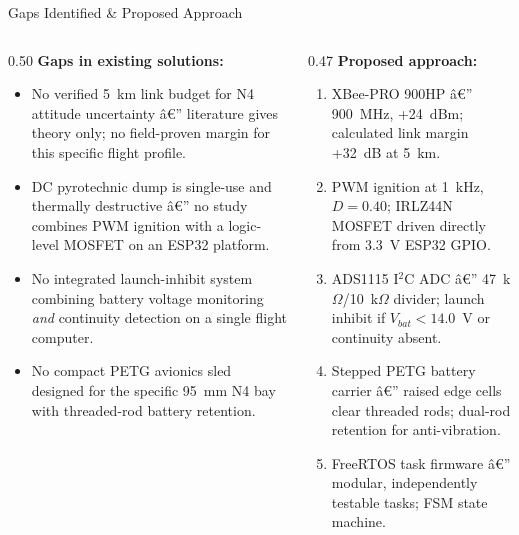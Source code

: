 \documentclass[aspectratio=169, 11pt]{beamer}
\begin{document}
\begin{frame}{Gaps Identified \& Proposed Approach}
\begin{columns}[T]
  \begin{column}{0.50\textwidth}
    \textbf{Gaps in existing solutions:}
    \begin{itemize}
      \item No verified 5~km link budget for N4 attitude uncertainty â€” literature gives theory only; no field-proven margin for this specific flight profile.
      \item DC pyrotechnic dump is single-use and thermally destructive â€” no study combines PWM ignition with a logic-level MOSFET on an ESP32 platform.
      \item No integrated launch-inhibit system combining battery voltage monitoring \emph{and} continuity detection on a single flight computer.
      \item No compact PETG avionics sled designed for the specific 95~mm N4 bay with threaded-rod battery retention.
    \end{itemize}
  \end{column}
  \begin{column}{0.47\textwidth}
    \textbf{Proposed approach:}
    \begin{enumerate}\setlength{\itemsep}{2pt}
      \item \alert{XBee-PRO 900HP} â€” 900~MHz, +24~dBm; calculated link margin +32~dB at 5~km.
      \item \alert{PWM ignition} at 1~kHz, $D=0.40$; IRLZ44N MOSFET driven directly from 3.3~V ESP32 GPIO.
      \item \alert{ADS1115 I$^2$C ADC} â€” 47~k$\Omega$/10~k$\Omega$ divider; launch inhibit if $V_{bat}<14.0$~V or continuity absent.
      \item \alert{Stepped PETG battery carrier} â€” raised edge cells clear threaded rods; dual-rod retention for anti-vibration.
      \item \alert{FreeRTOS task firmware} â€” modular, independently testable tasks; FSM state machine.
    \end{enumerate}
  \end{column}
\end{columns}
\end{frame}
\end{document}
